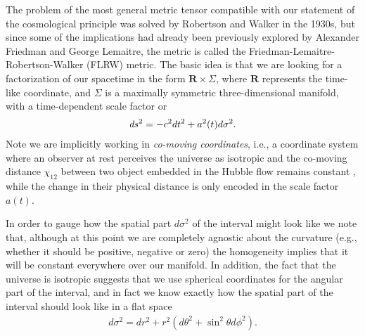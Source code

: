 The problem of the most general metric tensor compatible with our statement of the
cosmological principle was solved by Robertson and Walker in the 1930s, but since
some of the implications had already been previously explored by Alexander Friedman
and George Lemaitre, the metric is called the Friedman-Lemaitre-Robertson-Walker
(FLRW) metric. The basic idea is that we are looking for a factorization of our spacetime
in the form $\mathbf{R} \times \Sigma$, where $\mathbf{R}$ represents the time-like
coordinate, and $\Sigma$ is a maximally symmetric three-dimensional manifold, with
a time-dependent scale factor or
\begin{align*}
  \emph{d}s^2 = -c^2dt^2 + a^2(t) d\sigma^2.
\end{align*}
Note we are implicitly working in \emph{co-moving coordinates}, i.e., a coordinate
system where an observer at rest perceives the universe as isotropic and the co-moving
distance $\chi_{12}$ between two object embedded in the Hubble flow remains
constant , while the change in their physical distance is only encoded in the
scale factor $a(t)$.

In order to gauge how the spatial part $d\sigma^2$ of the interval might look like
we note that, although at this point we are completely agnostic about the curvature
(e.g., whether it should be positive, negative or zero) the homogeneity implies
that it will be constant everywhere over our manifold. In addition, the fact that
the universe  is isotropic suggests that we use spherical coordinates for the angular
part of the interval, and in fact we know exactly how the spatial part of the interval
should look like in a flat space
\begin{align}\label{eq:spherical_line_element_flat}
  d\sigma^2 = dr^2 + r^2 (d\theta^2 + \sin^2\theta d\phi^2).
\end{align}

